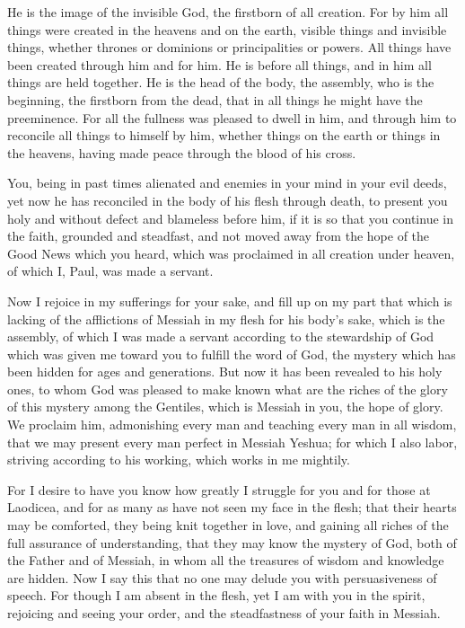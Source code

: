 \myverse{}He is the image of the invisible God, the firstborn of all creation.
\myverse{}For by him all things were created in the heavens and on the earth, visible
things and invisible things, whether thrones or dominions or principalities or powers. All things have
been created through him and for him.
\myverse{}He is before all things, and in him all things are held together.
\myverse{}He is the head of the body, the assembly, who is the beginning, the firstborn
from the dead, that in all things he might have the preeminence.
\myverse{}For all the fullness was pleased to dwell in him,
\myverse{}and through him to reconcile all things to himself by him, whether things
on the earth or things in the heavens, having made peace through the blood of his cross.

\myverse{}You, being in past times alienated and enemies in your mind in
your evil deeds,
\myverse{}yet now he has reconciled in the body of his flesh through death, to present
you holy and without defect and blameless before him,
\myverse{}if it is so that you continue in the faith, grounded and steadfast, and not
moved away from the hope of the Good News which you heard, which was proclaimed in all creation under
heaven, of which I, Paul, was made a servant.

\myverse{}Now I rejoice in my sufferings for your sake, and fill up on
my part that which is lacking of the afflictions of Messiah in my flesh for his body’s sake, which is
the assembly,
\myverse{}of which I was made a servant according to the stewardship of God which was
given me toward you to fulfill the word of God,
\myverse{}the mystery which has been hidden for ages and generations. But now it has
been revealed to his holy ones,
\myverse{}to whom God was pleased to make known what are the riches of the glory of
this mystery among the Gentiles, which is Messiah in you, the hope of glory.
\myverse{}We proclaim him, admonishing every man and teaching every man in all wisdom,
that we may present every man perfect in Messiah Yeshua;
\myverse{}for which I also labor, striving according to his working, which works in
me mightily.


\mychapter{} \myverse*{}For I desire to have you know how greatly I struggle for you and
for those at Laodicea, and for as many as have not seen my face in the flesh;
\myverse{}that their hearts may be comforted, they being knit together in love, and gaining
all riches of the full assurance of understanding, that they may know the mystery of God, both of the
Father and of Messiah,
\myverse{}in whom all the treasures of wisdom and knowledge are hidden.
\myverse{}Now I say this that no one may delude you with persuasiveness of speech.
\myverse{}For though I am absent in the flesh, yet I am with you in the spirit, rejoicing
and seeing your order, and the steadfastness of your faith in Messiah.

